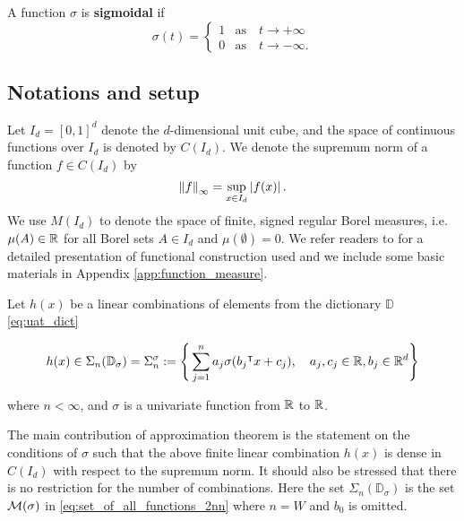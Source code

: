 
\begin{definition}\label{def:sigmoidal}
    A function $\sigma$ is \textbf{sigmoidal} if
    \begin{equation}
        \sigma(t) =
        \begin{cases}
            1 & \text{as} \quad t \to +\infty \\
            0 & \text{as} \quad t \to -\infty.
        \end{cases}
    \end{equation}
\end{definition}

\subsection*{Notations and setup}

Let $I_d = [0,1]^d$ denote the $d$-dimensional unit cube, and the space of
continuous functions over $I_d$ is denoted by $C(I_d)$. We denote the supremum
norm of a function $f \in C(I_d)$ by
\begin{equation}
    \label{def:sup_norm}
    \left\| f \right\|_{\infty} = \sup_{x\in I_d} \left| f(x) \right|.
\end{equation}
We use $M(I_d)$ to denote the space of finite, signed regular Borel measures,
i.e. $\mu(A) \in \mathbb{R}$ for all Borel sets $A \in I_d$ and $\mu(\emptyset)= 0$. We
refer readers to \cite{rudinFunctionalAnalysis1991,
rudinRealComplexAnalysis1987} for a detailed presentation of functional
construction used and we include some basic materials in Appendix
\ref{app:function_measure}.

Let $h(x)$ be a linear combinations of elements from the dictionary $\mathbb{D}$
\eqref{eq:uat_dict}

\begin{align}
    \label{eq:sum_sigma}
    h(x) \in 
    \Sigma_n(\mathbb{D}_{\sigma}) = \Sigma_n^{\sigma} := \Bigg\{
        \sum_{j=1}^n a_j \sigma(b_j{}^{\intercal} x + c_j), \quad
        a_j, c_j \in \mathbb{R},  b_j \in \mathbb{R}^d
    \Bigg\}
\end{align}

where  $n < \infty$, and $\sigma$ is a univariate function from $\mathbb{R}$ to $\mathbb{R}$.
 
The main contribution of approximation theorem is the statement on the
conditions of $\sigma$ such that the above finite linear combination $h(x)$ is
dense in $C(I_d)$ with respect to the supremum norm. It should also be stressed
that there is no restriction for the number of combinations. Here the set
$\Sigma_n(\mathbb{D}_{\sigma})$ is the set $\mathcal{M}(\sigma)$ in
\eqref{eq:set_of_all_functions_2nn} where $n = W$ and $b_0$ is omitted.

